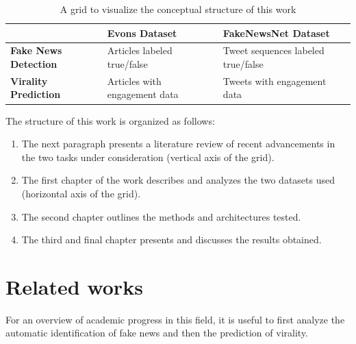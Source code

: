 \documentclass[a4paper,twoside,12pt]{book}
\begin{document}
	\noindent
	\begin{table}[H]
	\begin{tabular}{p{5.5cm} | p{5cm} | p{5cm}}
		& \textbf{Evons Dataset} & \textbf{FakeNewsNet Dataset} \\[0.3em] \hline
		\textbf{Fake News Detection} & Articles labeled true/false & Tweet sequences labeled true/false \\[0.2em]
		\textbf{Virality Prediction} & Articles with engagement data & Tweets with engagement data \\
	\end{tabular}
	\caption{A grid to visualize the conceptual structure of this work} \label{tab:grid}
	\end{table}
	
	\noindent The structure of this work is organized as follows:
	\begin{enumerate}
		\item The next paragraph presents a literature review of recent advancements in the two tasks under consideration (vertical axis of the grid).
		\item The first chapter of the work describes and analyzes the two datasets used (horizontal axis of the grid).
		\item The second chapter outlines the methods and architectures tested.
		\item The third and final chapter presents and discusses the results obtained.
	\end{enumerate}
	
	
	\clearpage
	
	\section*{Related works}
	For an overview of academic progress in this field, it is useful to first analyze the automatic identification of fake news and then the prediction of virality.
	
\end{document}
